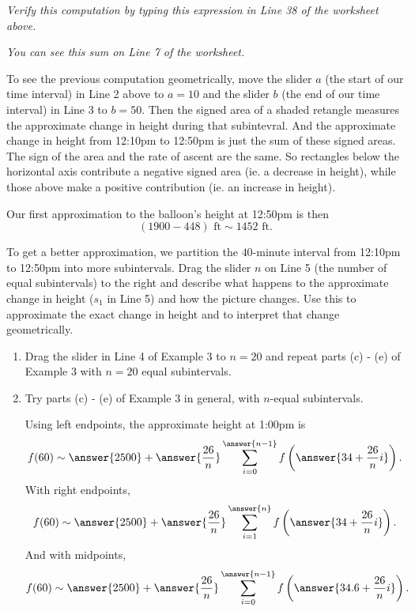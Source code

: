 \documentclass{ximera}
\begin{document}
\begin{example}
\emph{Verify this computation by typing this expression in Line 38 of the worksheet above.}

\emph{You can see this sum on Line 7 of the worksheet.}

To see the previous computation geometrically, move the slider $a$ (the start of our time interval) in Line 2 above to $a=10$ and the slider $b$ (the end of our time interval) in Line 3 to $b=50$. Then the signed area of a shaded retangle measures the approximate change in height during that subintevral. And the approximate change in height from 12:10pm to 12:50pm is just the sum of these signed areas. The sign of the area and the rate of ascent are the same. So rectangles below the horizontal axis contribute a negative signed area (ie. a decrease in height), while those above make a positive contribution (ie. an increase in height).

Our first approximation to the balloon's height at 12:50pm is then 
\[
    (1900  - 448 )\text{ ft} \sim 1452 \text{ ft}.
\]

To get a better approximation, we partition the $40$-minute interval from 12:10pm to 12:50pm into more subintervals. Drag the slider $n$ on Line 5 (the number of equal subintervals) to the right and describe what happens to the approximate change in height ($s_1$ in Line 5) and how the picture changes. Use this to approximate the exact change in height and to interpret that change geometrically. 

\begin{freeResponse}
\end{freeResponse}

 


\end{example} 

\begin{example}  \label{Ex:IjdRJrehreDF}
\begin{enumerate}
\item  Drag the slider in Line 4 of Example 3 to $n=20$ and repeat parts (c) - (e) of Example 3 with $n=20$ equal subintervals. 

\item Try parts (c) - (e) of Example 3 in general, with $n$-equal subintervals.

Using left endpoints, the approximate height at 1:00pm is
\[
        f(60) \sim   \answer{2500} +  \answer{\frac{26}{n}} \sum_{i=0}^{\answer{n-1}} f\left(\answer{34+ \frac{26}{n}i}\right)  .
\]
With right endpoints,
\[
        f(60) \sim   \answer{2500} +  \answer{\frac{26}{n}} \sum_{i=1}^{\answer{n}} f\left(\answer{34+ \frac{26}{n}i}\right)  .
\]
And with midpoints,
\[
        f(60) \sim   \answer{2500} +  \answer{\frac{26}{n}} \sum_{i=0}^{\answer{n-1}} f\left(\answer{34.6+ \frac{26}{n}i}\right)  .
\]

\end{enumerate}
\end{example}
\end{document}
